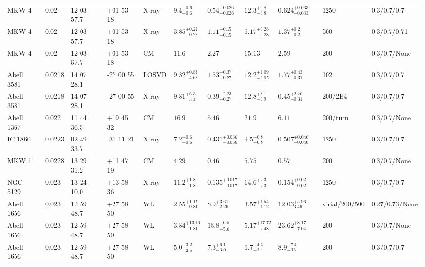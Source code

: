 \begin{landscape}
\begin{center}
{\begin{longtable}{llllllllllll}
MKW 4 & 0.02 & 12 03 57.7 & +01 53 18 & X-ray & ${9.4}^{+0.6}_{-0.6}$ & ${0.54}^{+0.026}_{-0.026}$ & ${12.3}^{+0.8}_{-0.8}$ & ${0.624}^{+0.033}_{-0.033}$ & \citet{GA06.1} & 1250 & 0.3/0.7/0.7 \\
MKW 4 & 0.02 & 12 03 57.7 & +01 53 18 & X-ray & ${3.85}^{+0.22}_{-0.22}$ & ${1.11}^{+0.15}_{-0.15}$ & ${5.17}^{+0.28}_{-0.28}$ & ${1.37}^{+0.2}_{-0.2}$ & \citet{VI06.1} & 500 & 0.3/0.7/0.71 \\
MKW 4 & 0.02 & 12 03 57.7 & +01 53 18 & CM & ${11.6}^{}_{}$ & ${2.27}^{}_{}$ & ${15.13}^{}_{}$ & ${2.59}^{}_{}$ & \citet{RI06.1} & 200 & 0.3/0.7/None \\
Abell 3581 & 0.0218 & 14 07 28.1 & -27 00 55 & LOSVD & ${9.32}^{+0.83}_{-4.62}$ & ${1.53}^{+0.37}_{-0.27}$ & ${12.2}^{+1.09}_{-6.05}$ & ${1.77}^{+0.43}_{-0.31}$ & \citet{WO10.1} & 102 & 0.3/0.7/0.7 \\
Abell 3581 & 0.0218 & 14 07 28.1 & -27 00 55 & X-ray & ${9.81}^{+6.3}_{-5.4}$ & ${0.39}^{+2.23}_{-0.27}$ & ${12.8}^{+8.1}_{-6.9}$ & ${0.45}^{+2.76}_{-0.31}$ & \citet{VO06.1} & 200/2E4 & 0.3/0.7/0.7 \\
Abell 1367 & 0.022 & 11 44 36.5 & +19 45 32 & CM & ${16.9}^{}_{}$ & ${5.46}^{}_{}$ & ${21.9}^{}_{}$ & ${6.11}^{}_{}$ & \citet{RI03.1} & 200/turn & 0.3/0.7/None \\
IC 1860 & 0.0223 & 02 49 33.7 & -31 11 21 & X-ray & ${7.2}^{+0.6}_{-0.6}$ & ${0.431}^{+0.036}_{-0.036}$ & ${9.5}^{+0.8}_{-0.8}$ & ${0.507}^{+0.046}_{-0.046}$ & \citet{GA06.1} & 1250 & 0.3/0.7/0.7 \\
MKW 11 & 0.0228 & 13 29 31.2 & +11 47 19 & CM & ${4.29}^{}_{}$ & ${0.46}^{}_{}$ & ${5.75}^{}_{}$ & ${0.57}^{}_{}$ & \citet{RI06.1} & 200 & 0.3/0.7/None \\
NGC 5129 & 0.023 & 13 24 10.0 & +13 58 36 & X-ray & ${11.2}^{+1.8}_{-1.8}$ & ${0.135}^{+0.017}_{-0.017}$ & ${14.6}^{+2.3}_{-2.3}$ & ${0.154}^{+0.02}_{-0.02}$ & \citet{GA06.1} & 1250 & 0.3/0.7/0.7 \\
Abell 1656 & 0.023 & 12 59 48.7 & +27 58 50 & WL & ${2.55}^{+1.17}_{-0.84}$ & ${8.9}^{+3.61}_{-2.26}$ & ${3.57}^{+1.54}_{-1.12}$ & ${12.03}^{+5.96}_{3.46}$ & \citet{OK14.1} & virial/200/500 & 0.27/0.73/None \\
Abell 1656 & 0.023 & 12 59 48.7 & +27 58 50 & WL & ${3.84}^{+13.16}_{-1.84}$ & ${18.8}^{+6.5}_{-5.6}$ & ${5.17}^{+17.72}_{-2.48}$ & ${23.62}^{+8.17}_{-7.04}$ & \citet{KU07.1} & 200 & 0.3/0.7/None \\
Abell 1656 & 0.023 & 12 59 48.7 & +27 58 50 & WL & ${5.0}^{+3.2}_{-2.5}$ & ${7.3}^{+6.1}_{-3.0}$ & ${6.7}^{+4.3}_{-3.4}$ & ${8.9}^{+7.4}_{-3.7}$ & \citet{GA09.1} & 200 & 0.3/0.7/0.7 \\

\end{longtable}}
\end{center}
\end{landscape}
